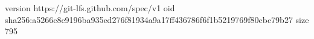 version https://git-lfs.github.com/spec/v1
oid sha256:a5266c8c9196ba935ed276f81934a9a17ff436786f6f1b5219769f80cbc79b27
size 795
